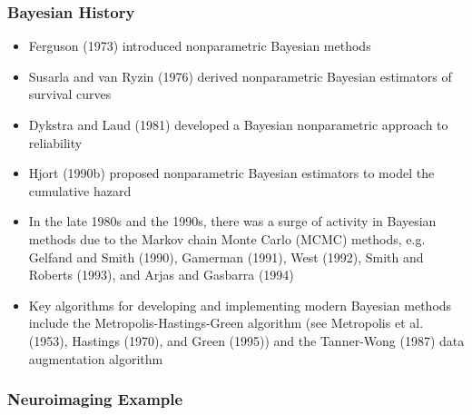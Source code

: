 \documentclass[10pt]{beamer}
\begin{document}
\begin{frame}
\frametitle{Bayesian History}

\begin{itemize}
\item Ferguson (1973) introduced nonparametric Bayesian methods
\item Susarla and van Ryzin (1976) derived nonparametric Bayesian estimators of survival curves
\item Dykstra and Laud (1981) developed a Bayesian nonparametric approach to reliability
\item Hjort (1990b) proposed nonparametric Bayesian estimators to model the cumulative hazard
\item In the late 1980s and the 1990s, there was a surge of activity in Bayesian methods due to the Markov chain Monte Carlo (MCMC) methods, e.g. Gelfand and Smith (1990), Gamerman (1991), West (1992), Smith and Roberts (1993), and Arjas and Gasbarra (1994)
\item Key algorithms for developing and implementing modern Bayesian methods include the Metropolis-Hastings-Green algorithm (see Metropolis et al. (1953), Hastings (1970), and Green (1995)) and the Tanner-Wong (1987) data augmentation algorithm
\end{itemize}

\end{frame}

\begin{frame}
\frametitle{Neuroimaging Example}

\end{frame}
\end{document}
